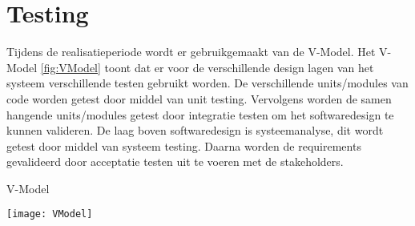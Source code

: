 \newpage
\section{Testing}
\label{sec:Testing}
Tijdens de realisatieperiode wordt er gebruikgemaakt van de V-Model.
Het V-Model \ref{fig:VModel} toont dat er voor de verschillende design lagen van het systeem verschillende testen gebruikt worden.
De verschillende units/modules van code worden getest door middel van unit testing.
Vervolgens worden de samen hangende units/modules getest door integratie testen om het softwaredesign te kunnen valideren.
De laag boven softwaredesign is systeemanalyse, dit wordt getest door middel van systeem testing.
Daarna worden de requirements gevalideerd door acceptatie testen uit te voeren met de stakeholders. \\
\begin{graphic}
    \vspace{0.2cm}
    \captionsetup{type=figure}
    \caption{V-Model \Parencite{VModel}}
    \texttt{[image: VModel]}
    \label{fig:VModel}
    \vspace{0.2cm}
\end{graphic}
